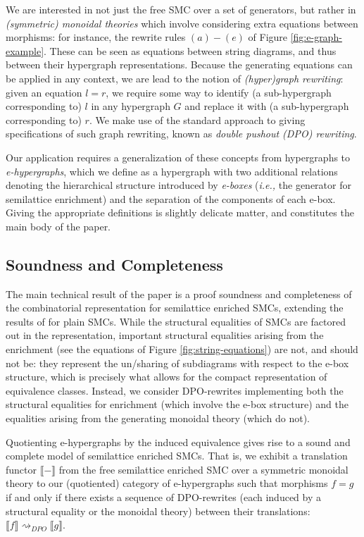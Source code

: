 We are interested in not just the free SMC over a set of generators, but rather in \textit{(symmetric) monoidal theories} which involve considering extra equations between morphisms: for instance, the rewrite rules $(a)-(e)$ of Figure \ref{fig:e-graph-example}. These can be seen as equations between string diagrams, and thus between their hypergraph representations.  Because the generating equations can be applied in any context, we are lead to the notion of \textit{(hyper)graph rewriting}: given an equation $l=r$, we require some way to identify (a sub-hypergraph corresponding to) $l$ in any hypergraph $G$ and replace it with (a sub-hypergraph corresponding to) $r$.
We make use of the standard approach to giving specifications of such graph rewriting, known as \textit{double pushout (DPO) rewriting}.

Our application requires a generalization of these concepts from hypergraphs to \textit{e-hypergraphs}, which we define as a hypergraph with two additional relations denoting the hierarchical structure introduced by \textit{e-boxes} (\textit{i.e.,} the generator for semilattice enrichment) and the separation of the components of each e-box.
Giving the appropriate definitions is slightly delicate matter, and constitutes the main body of the paper. 

\subsection{Soundness and Completeness}
The main technical result of the paper is a proof soundness and completeness of the combinatorial representation for semilattice enriched SMCs, extending the results of \cite{bonchi_string_2022-2} for plain SMCs. While the structural equalities of SMCs are factored out in the representation,  important structural equalities arising from the enrichment (see the equations of Figure \ref{fig:string-equations}) are not, and should not be: they represent the un/sharing of subdiagrams with respect to the e-box structure,  which is precisely what allows for the compact representation of equivalence classes.  Instead, we consider DPO-rewrites implementing both the structural equalities for enrichment (which involve the e-box structure) and the equalities arising from the generating monoidal theory (which do not).  

Quotienting e-hypergraphs by the induced equivalence gives rise to a sound and complete model of semilattice enriched SMCs.  That is, we exhibit a translation functor $\llbracket-\rrbracket$ from the free semilattice enriched SMC over a symmetric monoidal theory to our (quotiented) category of e-hypergraphs such that 
morphisms $f = g$ if and only if there exists a sequence of DPO-rewrites (each induced by a structural equality or the monoidal theory) between their translations: $\llbracket f \rrbracket \rightsquigarrow_{DPO} \llbracket g \rrbracket$. 

